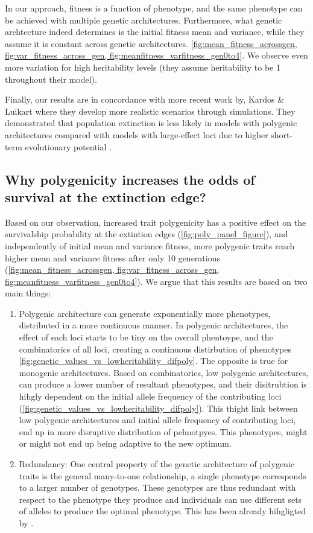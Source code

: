 \documentclass{article}
\begin{document}
In our approach, fitness is a function of phenotype, and the same phenotype can be achieved with multiple genetic architectures. Furthermore, what genetic archtecture indeed determines is the initial fitness mean and variance, while they assume it is constant across genetic architectures.  \ref{fig:mean_fitness_acrossgen, fig:var_fitness_across_gen,  fig:meanfitness_varfitness_gen0to4}. We observe even more variation for high heritability levels (they assume heritability to be 1 throughout their model).

Finally, our results are in concordance with more recent work by, Kardos \& Luikart where they develop more realistic scenarios through simulations. They demonstrated that population extinction is less likely in models with polygenic architectures compared with models with large-effect loci due to higher short-term evolutionary potential \citep{Kardos2021-jd}. 

\subsection{Why polygenicity increases the odds of survival at the extinction edge?}
Based on our observation, increased trait polygenicity has a positive effect on the survivalship probability at the extintion edges (\ref{fig:poly_panel_figure}), and independently of initial mean and variance fitness, more polygenic traits reach higher mean  and variance fitness after only 10 generations (\ref{fig:mean_fitness_acrossgen,  fig:var_fitness_across_gen, fig:meanfitness_varfitness_gen0to4}). We argue that this results are based on two main things: 
\begin{enumerate}
    \item Polygenic architecture can generate exponentially more phenotypes, distributed in a more continuous manner. In polygenic architectures, the effect of each loci starts to be tiny on the overall phentoype, and the combinatorics of all loci, creating a continuous distirbution of phenotypes \ref{fig:genetic_values_vs_lowheritability_difpoly}. The opposite is true for monogenic architectures. Based on combinatorics, low polygenic architectures, can produce a lower number of resultant phenotypes, and their disitrubtion is hihgly dependent on the initial allele frequency of the contributing loci (\ref{fig:genetic_values_vs_lowheritability_difpoly}). This thight link between low polygenic architectures and initial allele frequency of contributing loci, end up in more disruptive distribution of pehnotpyes. This phenotypes, might or might not end up being adaptive to the new optimum. 

    \item Redundancy: One central property of the genetic architecture of polygenic traits is the general many-to-one relationship, a single phenotype corresponds to a larger number of genotypes. These genotypes are thus redundant with respect to the phenotype they produce and individuals can use different sets of alleles to produce the optimal phenotype. This has been already hihgligted by \citep{Orr2008-jl}. 
\end{enumerate}
\end{document}
